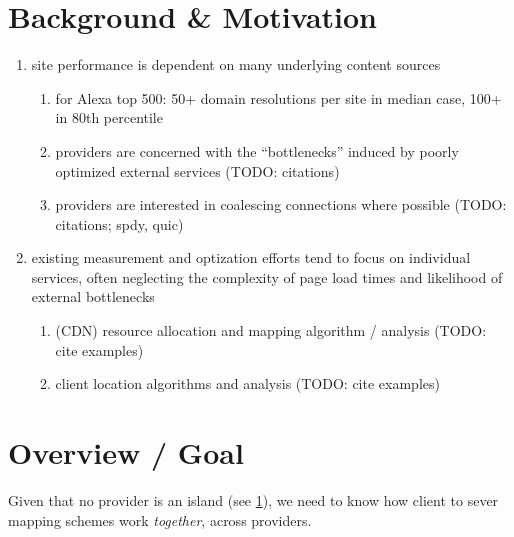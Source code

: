 \documentclass[10pt, sigconf]{acmart}
\begin{document}



\maketitle

\section{Background \& Motivation} \label{sect:background}
\begin{enumerate}
    \item site performance is dependent on many underlying content sources
        \begin{enumerate}
            \item for Alexa top 500: 50+ domain resolutions per site in median case, 100+ in 80th
                percentile \cite{dnssly}
            \item providers are concerned with the ``bottlenecks'' induced by
                poorly optimized external services (TODO: citations)
            \item providers are interested in coalescing connections where
                possible (TODO: citations; spdy, quic)
        \end{enumerate}
    \item existing measurement and optization efforts tend to focus on
        individual services, often neglecting the complexity of page load times
        and likelihood of external bottlenecks
        \begin{enumerate}
            \item (CDN) resource allocation and mapping algorithm / analysis (TODO: cite
                examples)
            \item client location algorithms and analysis (TODO: cite examples)
        \end{enumerate}
\end{enumerate}

\section{Overview / Goal}
Given that no provider is an island (see \ref{sect:background}), we need to know
how client to sever mapping schemes work \emph{together}, across providers.
\end{document}
